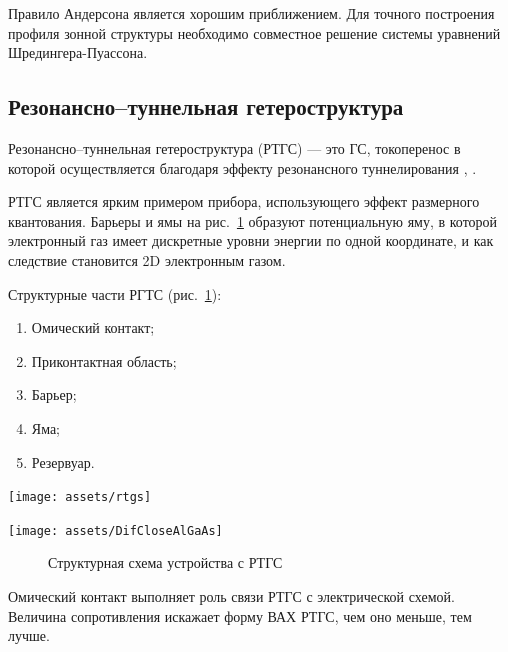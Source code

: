 Правило Андерсона является хорошим приближением. Для точного построения профиля зонной структуры необходимо совместное решение системы уравнений Шредингера-Пуассона.


\subsection{Резонансно--туннельная гетероструктура}
Резонансно--туннельная гетероструктура (РТГС) --- это ГС, токоперенос в которой осуществляется благодаря эффекту резонансного туннелирования \cite{Usanov}, \cite{Moskaluk}.

РТГС является ярким примером прибора, использующего эффект размерного квантования. Барьеры и ямы на рис.~\ref{img:rtgs} образуют потенциальную яму, в которой электронный газ имеет дискретные уровни энергии по одной координате, и как следствие становится 2D электронным газом.

Структурные части РГТС (рис.~\ref{img:rtgs}):
\begin{enumerate}
  \item Омический контакт;
  \item Приконтактная область;
  \item Барьер;
  \item Яма;
  \item Резервуар.
\end{enumerate}

\noindent
\begin{minipage}[b]{0.45\textwidth}
  \centering
    \texttt{[image: assets/rtgs]}\\
\end{minipage}
\hfill
\begin{minipage}[b]{0.55\textwidth}
  \centering
  \texttt{[image: assets/DifCloseAlGaAs]}\\
\end{minipage}

\begin{figure}[h!]
  \centering
  \caption{Структурная схема устройства с РТГС}
  \label{img:rtgs}
\end{figure}

Омический контакт выполняет роль связи РТГС с электрической схемой. Величина сопротивления искажает форму ВАХ РТГС, чем оно меньше, тем лучше.


